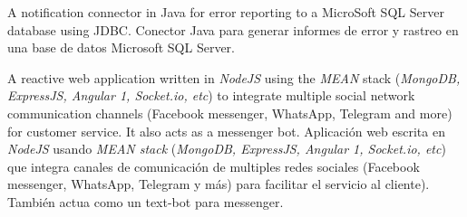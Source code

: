 
    {\ml
    {A notification connector in Java for error reporting to a MicroSoft SQL
    Server database using JDBC.}
    {Conector Java para generar informes de error y rastreo en una base de
    datos Microsoft SQL Server.}
}


    {\ml
    {A reactive web application written in \textit{NodeJS} using the
    \textit{MEAN} stack (\textit{MongoDB, ExpressJS, Angular 1, Socket.io,
    etc}) to integrate multiple social network communication channels (Facebook
    messenger, WhatsApp, Telegram and more) for customer service. It also acts
    as a messenger bot.}
    {Aplicación web escrita en \textit{NodeJS} usando \textit{MEAN stack}
    (\textit{MongoDB, ExpressJS, Angular 1, Socket.io, etc}) que integra
    canales de comunicación de multiples redes sociales (Facebook messenger,
    WhatsApp, Telegram y más) para facilitar el servicio al cliente). También
    actua como un text-bot para messenger.}
}


